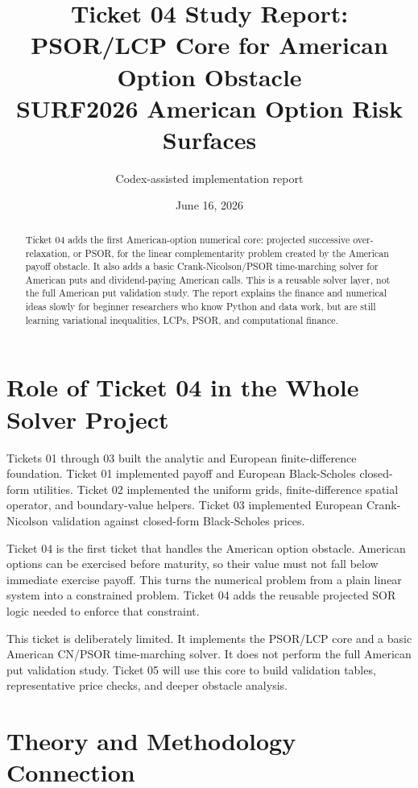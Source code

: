 \documentclass[11pt,a4paper]{article}
\title{\textbf{Ticket 04 Study Report: PSOR/LCP Core for American Option Obstacle}\\
\large SURF2026 American Option Risk Surfaces}
\author{Codex-assisted implementation report}
\date{June 16, 2026}
\begin{document}
\maketitle

\begin{abstract}
Ticket 04 adds the first American-option numerical core: projected successive
over-relaxation, or PSOR, for the linear complementarity problem created by the
American payoff obstacle. It also adds a basic Crank-Nicolson/PSOR time-marching
solver for American puts and dividend-paying American calls. This is a reusable
solver layer, not the full American put validation study. The report explains the
finance and numerical ideas slowly for beginner researchers who know Python and
data work, but are still learning variational inequalities, LCPs, PSOR, and
computational finance.
\end{abstract}

\tableofcontents
\newpage

\section{Role of Ticket 04 in the Whole Solver Project}

Tickets 01 through 03 built the analytic and European finite-difference foundation. Ticket 01
implemented payoff and European Black-Scholes closed-form utilities. Ticket 02 implemented the
uniform grids, finite-difference spatial operator, and boundary-value helpers. Ticket 03
implemented European Crank-Nicolson validation against closed-form Black-Scholes prices.

Ticket 04 is the first ticket that handles the American option obstacle. American options can be
exercised before maturity, so their value must not fall below immediate exercise payoff. This
turns the numerical problem from a plain linear system into a constrained problem. Ticket 04 adds
the reusable projected SOR logic needed to enforce that constraint.

This ticket is deliberately limited. It implements the PSOR/LCP core and a basic American
CN/PSOR time-marching solver. It does not perform the full American put validation study. Ticket
05 will use this core to build validation tables, representative price checks, and deeper
obstacle analysis.

\section{Theory and Methodology Connection}
\end{document}
